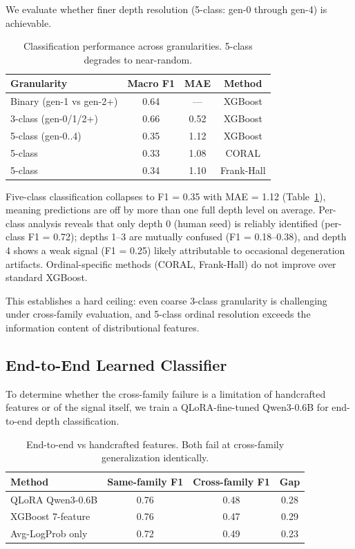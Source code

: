 \documentclass[11pt,a4paper]{article}
\begin{document}
We evaluate whether finer depth resolution (5-class: gen-0 through gen-4) is achievable.

\begin{table}[h]
\centering
\caption{Classification performance across granularities. 5-class degrades to near-random.}
\label{tab:ordinal}
\begin{tabular}{lccc}
\toprule
Granularity & Macro F1 & MAE & Method \\
\midrule
Binary (gen-1 vs gen-2+) & 0.64 & --- & XGBoost \\
3-class (gen-0/1/2+) & 0.66 & 0.52 & XGBoost \\
5-class (gen-0..4) & 0.35 & 1.12 & XGBoost \\
5-class & 0.33 & 1.08 & CORAL \\
5-class & 0.34 & 1.10 & Frank-Hall \\
\bottomrule
\end{tabular}
\end{table}

Five-class classification collapses to F1 = 0.35 with MAE = 1.12 (Table~\ref{tab:ordinal}), meaning predictions are off by more than one full depth level on average.
Per-class analysis reveals that only depth 0 (human seed) is reliably identified (per-class F1 = 0.72); depths 1--3 are mutually confused (F1 = 0.18--0.38), and depth 4 shows a weak signal (F1 = 0.25) likely attributable to occasional degeneration artifacts.
Ordinal-specific methods (CORAL, Frank-Hall) do not improve over standard XGBoost.

This establishes a hard ceiling: even coarse 3-class granularity is challenging under cross-family evaluation, and 5-class ordinal resolution exceeds the information content of distributional features.

\subsection{End-to-End Learned Classifier}
\label{sec:e2e}

To determine whether the cross-family failure is a limitation of handcrafted features or of the signal itself, we train a QLoRA-fine-tuned Qwen3-0.6B for end-to-end depth classification.

\begin{table}[h]
\centering
\caption{End-to-end vs handcrafted features. Both fail at cross-family generalization identically.}
\label{tab:e2e}
\begin{tabular}{lccc}
\toprule
Method & Same-family F1 & Cross-family F1 & Gap \\
\midrule
QLoRA Qwen3-0.6B & 0.76 & 0.48 & 0.28 \\
XGBoost 7-feature & 0.76 & 0.47 & 0.29 \\
Avg-LogProb only & 0.72 & 0.49 & 0.23 \\
\bottomrule
\end{tabular}
\end{table}
\end{document}
